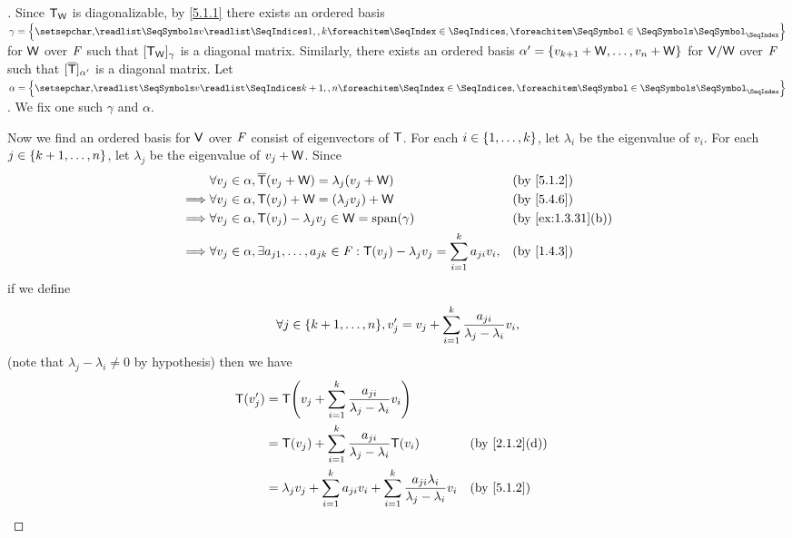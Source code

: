 \begin{proof}[]
  Since \(\mathsf{T}_{\mathsf{W}}\) is diagonalizable, by \cref{5.1.1} there exists an ordered basis \(\gamma = \set{\seq{v}{1,,k}}\) for \(\mathsf{W}\) over \(\mathit{F}\) such that \([\mathsf{T}_{\mathsf{W}}]_{\gamma}\) is a diagonal matrix.
  Similarly, there exists an ordered basis \(\alpha' = \left\lbrace v_{k + 1} + \mathsf{W}, \dots, v_n + \mathsf{W}\right\rbrace\) for \(\mathsf{V} / \mathsf{W}\) over \(\mathit{F}\) such that \([\overline{\mathsf{T}}]_{\alpha'}\) is a diagonal matrix.
  Let \(\alpha = \set{\seq{v}{k+1,,n}}\).
  We fix one such \(\gamma\) and \(\alpha\).

  Now we find an ordered basis for \(\mathsf{V}\) over \(\mathit{F}\) consist of eigenvectors of \(\mathsf{T}\).
  For each \(i \in \left\lbrace1, \dots, k\right\rbrace\), let \(\lambda_i\) be the eigenvalue of \(v_i\).
  For each \(j \in \left\lbrace k + 1, \dots, n\right\rbrace\), let \(\lambda_j\) be the eigenvalue of \(v_j + \mathsf{W}\).
  Since
  \begin{align*}
             & \forall v_j \in \alpha, \overline{\T}(v_j + \W) = \lambda_j (v_j + \W)                                                 &  & \text{(by \cref{5.1.2})}        \\
    \implies & \forall v_j \in \alpha, \T(v_j) + \W = (\lambda_j v_j) + \W                                                            &  & \text{(by \cref{5.4.6})}        \\
    \implies & \forall v_j \in \alpha, \T(v_j) - \lambda_j v_j \in \W = \spn{\gamma}                                                  &  & \text{(by \cref{ex:1.3.31}(b))} \\
    \implies & \forall v_j \in \alpha, \exists a_{j 1}, \dots, a_{j k} \in \F : \T(v_j) - \lambda_j v_j = \sum_{i = 1}^k a_{j i} v_i, &  & \text{(by \cref{1.4.3})}
  \end{align*}
  if we define
  \[
    \forall j \in \set{k + 1, \dots, n}, v_j' = v_j + \sum_{i = 1}^k \frac{a_{j i}}{\lambda_j - \lambda_i} v_i,
  \]
  (note that \(\lambda_j - \lambda_i \neq 0\) by hypothesis)
  then we have
  \begin{align*}
    \T(v_j') & = \T\pa{v_j + \sum_{i = 1}^k \frac{a_{j i}}{\lambda_j - \lambda_i} v_i}                                                                            \\
             & = \T(v_j) + \sum_{i = 1}^k \frac{a_{j i}}{\lambda_j - \lambda_i} \T(v_i)                                          &  & \text{(by \cref{2.1.2}(d))} \\
             & = \lambda_j v_j + \sum_{i = 1}^k a_{j i} v_i + \sum_{i = 1}^k \frac{a_{j i} \lambda_i}{\lambda_j - \lambda_i} v_i &  & \text{(by \cref{5.1.2})}    \\

\end{align*}
\end{proof}
